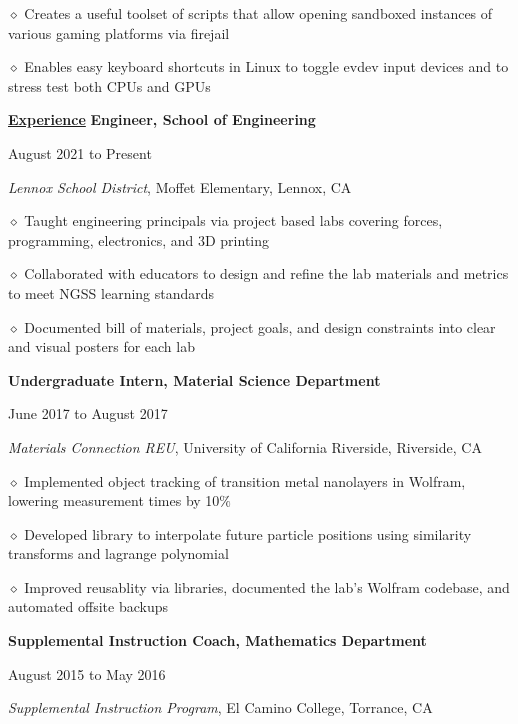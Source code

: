 \documentclass [11pt]{article}
\begin{document}
\begin{flushleft}
‭‭\quad\quad\quad$\diamond$ Creates a useful toolset of scripts that allow opening sandboxed instances of various gaming platforms via firejail

‭‭\quad\quad\quad$\diamond$ Enables easy keyboard shortcuts in Linux to toggle evdev input devices and to stress test both CPUs and GPUs

\vspace{7}
\underline{\textbf{Experience}}
\linebreak
\textbf{Engineer, School of Engineering}\begin{minipage}{0.7 \linewidth}\begin{flushright}August 2021 to Present\end{flushright}\end{minipage}
\emph{Lennox School District}, Moffet Elementary, Lennox, CA

‭‭\quad\quad\quad$\diamond$ Taught engineering principals via project based labs covering forces, programming, electronics, and 3D printing

\quad\quad\quad$\diamond$ Collaborated with educators to design and refine the lab materials and metrics to meet NGSS learning standards

‭‭\quad\quad\quad$\diamond$ Documented bill of materials, project goals, and design constraints into clear and visual posters for each lab

\linebreak
\textbf{Undergraduate Intern, Material Science Department}\begin{minipage}{0.535 \linewidth}\begin{flushright}June 2017 to August 2017\end{flushright}\end{minipage}
\emph{Materials Connection REU}, University of California Riverside, Riverside, CA

‭‭\quad\quad\quad$\diamond$ ‭Implemented object tracking of transition metal nanolayers in Wolfram, lowering measurement times by 10$\%$

‭‭\quad\quad\quad$\diamond$ Developed library to interpolate future particle positions using similarity transforms and lagrange polynomial

‭‭\quad\quad\quad$\diamond$ Improved reusablity via libraries, documented the lab’s Wolfram codebase, and automated offsite backups

\linebreak
\textbf{Supplemental Instruction Coach, Mathematics Department}\begin{minipage}{0.475 \linewidth}\begin{flushright}August 2015 to May 2016\end{flushright}\end{minipage}
\emph{Supplemental Instruction Program}, El Camino College, Torrance, CA


\end{flushleft}
\end{document}

